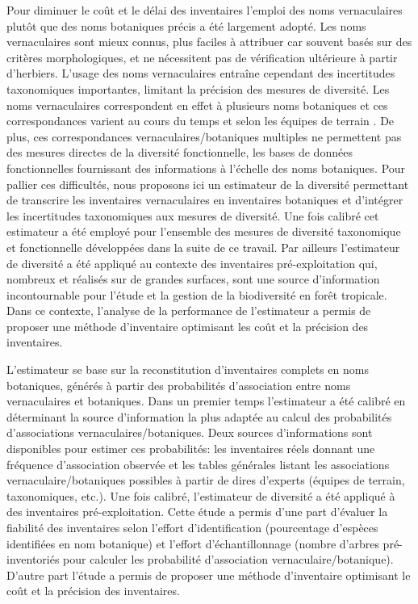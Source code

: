 \documentclass[
  11pt,
  french,
  A4paper,
  extrafontsizes,onecolumn,openright
  ]{memoir}
\begin{document}
Pour diminuer le coût et le délai des inventaires l'emploi des noms
vernaculaires plutôt que des noms botaniques précis a été largement
adopté. Les noms vernaculaires sont mieux connus, plus faciles à
attribuer car souvent basés sur des critères morphologiques, et ne
nécessitent pas de vérification ultérieure à partir d'herbiers. L'usage
des noms vernaculaires entraîne cependant des incertitudes taxonomiques
importantes, limitant la précision des mesures de diversité. Les noms
vernaculaires correspondent en effet à plusieurs noms botaniques et ces
correspondances varient au cours du temps et selon les équipes de
terrain \autocite{Oldeman1968}. De plus, ces correspondances
vernaculaires/botaniques multiples ne permettent pas des mesures
directes de la diversité fonctionnelle, les bases de données
fonctionnelles fournissant des informations à l'échelle des noms
botaniques. Pour pallier ces difficultés, nous proposons ici un
estimateur de la diversité permettant de transcrire les inventaires
vernaculaires en inventaires botaniques et d'intégrer les incertitudes
taxonomiques aux mesures de diversité. Une fois calibré cet estimateur a
été employé pour l'ensemble des mesures de diversité taxonomique et
fonctionnelle développées dans la suite de ce travail. Par ailleurs
l'estimateur de diversité a été appliqué au contexte des inventaires
pré-exploitation qui, nombreux et réalisés sur de grandes surfaces, sont
une source d'information incontournable
\autocites{terSteege2000}{Guitet2014} pour l'étude et la gestion de la
biodiversité en forêt tropicale. Dans ce contexte, l'analyse de la
performance de l'estimateur a permis de proposer une méthode
d'inventaire optimisant les coût et la précision des inventaires.

L'estimateur se base sur la reconstitution d'inventaires complets en
noms botaniques, générés à partir des probabilités d'association entre
noms vernaculaires et botaniques. Dans un premier temps l'estimateur a
été calibré en déterminant la source d'information la plus adaptée au
calcul des probabilités d'associations vernaculaires/botaniques. Deux
sources d'informations sont disponibles pour estimer ces probabilités:
les inventaires réels donnant une fréquence d'association observée et
les tables générales listant les associations vernaculaire/botaniques
possibles à partir de dires d'experts (équipes de terrain, taxonomiques,
etc.). Une fois calibré, l'estimateur de diversité a été appliqué à des
inventaires pré-exploitation. Cette étude a permis d'une part d'évaluer
la fiabilité des inventaires selon l'effort d'identification
(pourcentage d'espèces identifiées en nom botanique) et l'effort
d'échantillonnage (nombre d'arbres pré-inventoriés pour calculer les
probabilité d'association vernaculaire/botanique). D'autre part l'étude
a permis de proposer une méthode d'inventaire optimisant le coût et la
précision des inventaires.
\end{document}
